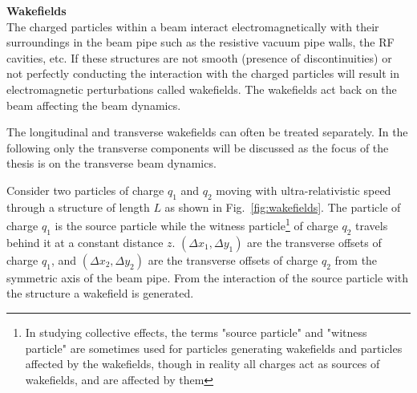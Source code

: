 \textbf{Wakefields}\\
The charged particles within a beam interact electromagnetically with their surroundings in the beam pipe such as the resistive vacuum pipe walls, the RF cavities, etc. If these structures are not smooth (presence of discontinuities) or not perfectly conducting the interaction with the charged particles will result in electromagnetic perturbations called wakefields. The wakefields act back on the beam affecting the beam dynamics.


The longitudinal and transverse wakefields can often be treated separately. In the following only the transverse components will be discussed as the focus of the thesis is on the transverse beam dynamics.


 
Consider two particles of charge $q_1$ and $q_2$ moving with ultra-relativistic speed through a structure of length $L$ as shown in Fig.~\ref{fig:wakefields}. The particle of charge $q_1$ is the source particle while the witness particle\footnote{In studying collective effects, the terms "source particle" and "witness particle" are sometimes used for particles generating wakefields and particles affected by the wakefields, though in reality all charges act as sources of wakefields, and are affected by them}  of charge $q_2$ travels behind it at a constant distance $z$. $(\Delta x_1, \Delta y_1)$ are the transverse offsets of charge $q_1$, and $(\Delta x_2, \Delta y_2)$ are the transverse offsets of charge $q_2$ from the symmetric axis of the beam pipe. From the interaction of the source particle with the structure a wakefield is generated. 

